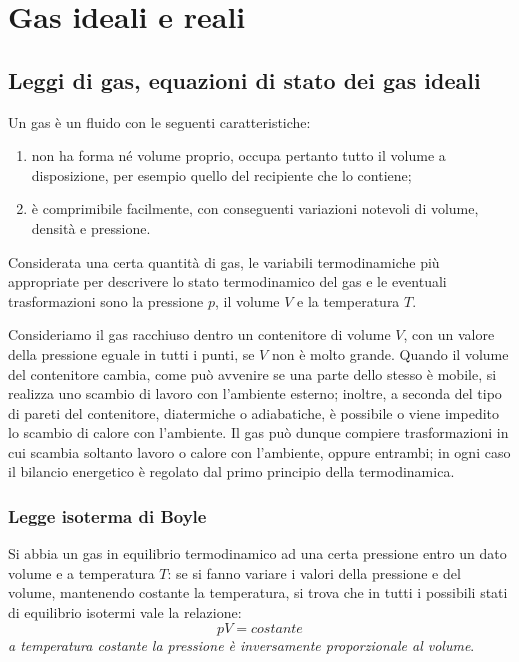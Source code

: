\documentclass[class=book, crop=false, oneside, 12pt]{standalone}
\begin{document}
\chapter{Gas ideali e reali}

\section{Leggi di gas, equazioni di stato dei gas ideali}

Un gas è un fluido con le seguenti caratteristiche:
\begin{enumerate}
    \item non ha forma né volume proprio, occupa pertanto tutto il volume a disposizione, per esempio quello del recipiente che lo contiene; 
    \item è comprimibile facilmente, con conseguenti variazioni notevoli di volume, densità e pressione.
\end{enumerate}

Considerata una certa quantità di gas, le variabili termodinamiche più appropriate per descrivere lo stato termodinamico del gas e le eventuali trasformazioni sono la pressione \(p\), il volume \(V\) e la temperatura \(T\).

Consideriamo il gas racchiuso dentro un contenitore di volume \(V\), con un valore della pressione eguale in tutti i punti, se \(V\) non è molto grande. 
Quando il volume del contenitore cambia, come può avvenire se una parte dello stesso è mobile, si realizza uno scambio di lavoro con l'ambiente esterno; inoltre, a seconda del tipo di pareti del contenitore, diatermiche o adiabatiche, è possibile o viene impedito lo scambio di calore con l'ambiente. 
Il gas può dunque compiere trasformazioni in cui scambia soltanto lavoro o calore con l'ambiente, oppure entrambi; in ogni caso il bilancio energetico è regolato dal primo principio della termodinamica.

\subsection{Legge isoterma di Boyle}

Si abbia un gas in equilibrio termodinamico ad una certa pressione entro un dato volume e a temperatura \(T\): se si fanno variare i valori della pressione e del volume, mantenendo costante la temperatura, si trova che in tutti i possibili stati di equilibrio isotermi vale la relazione:
\begin{equation} \label{legge_boyle}
    pV = costante
\end{equation}
\emph{a temperatura costante la pressione è inversamente proporzionale al volume}.
\end{document}
